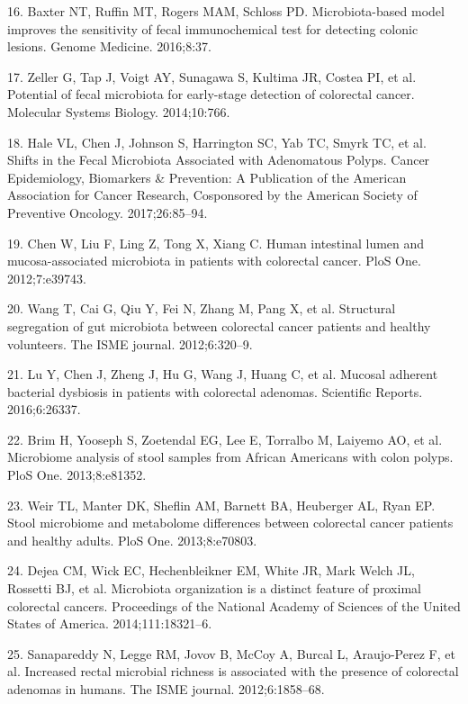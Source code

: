 \documentclass[12pt,]{article}
\begin{document}
\hypertarget{ref-baxter_microbiota-based_2016}{}
16. Baxter NT, Ruffin MT, Rogers MAM, Schloss PD. Microbiota-based model
improves the sensitivity of fecal immunochemical test for detecting
colonic lesions. Genome Medicine. 2016;8:37.

\hypertarget{ref-zeller_potential_2014}{}
17. Zeller G, Tap J, Voigt AY, Sunagawa S, Kultima JR, Costea PI, et al.
Potential of fecal microbiota for early-stage detection of colorectal
cancer. Molecular Systems Biology. 2014;10:766.

\hypertarget{ref-hale_shifts_2017}{}
18. Hale VL, Chen J, Johnson S, Harrington SC, Yab TC, Smyrk TC, et al.
Shifts in the Fecal Microbiota Associated with Adenomatous Polyps.
Cancer Epidemiology, Biomarkers \& Prevention: A Publication of the
American Association for Cancer Research, Cosponsored by the American
Society of Preventive Oncology. 2017;26:85--94.

\hypertarget{ref-chen_human_2012}{}
19. Chen W, Liu F, Ling Z, Tong X, Xiang C. Human intestinal lumen and
mucosa-associated microbiota in patients with colorectal cancer. PloS
One. 2012;7:e39743.

\hypertarget{ref-wang_structural_2012}{}
20. Wang T, Cai G, Qiu Y, Fei N, Zhang M, Pang X, et al. Structural
segregation of gut microbiota between colorectal cancer patients and
healthy volunteers. The ISME journal. 2012;6:320--9.

\hypertarget{ref-lu_mucosal_2016}{}
21. Lu Y, Chen J, Zheng J, Hu G, Wang J, Huang C, et al. Mucosal
adherent bacterial dysbiosis in patients with colorectal adenomas.
Scientific Reports. 2016;6:26337.

\hypertarget{ref-brim_microbiome_2013}{}
22. Brim H, Yooseph S, Zoetendal EG, Lee E, Torralbo M, Laiyemo AO, et
al. Microbiome analysis of stool samples from African Americans with
colon polyps. PloS One. 2013;8:e81352.

\hypertarget{ref-weir_stool_2013}{}
23. Weir TL, Manter DK, Sheflin AM, Barnett BA, Heuberger AL, Ryan EP.
Stool microbiome and metabolome differences between colorectal cancer
patients and healthy adults. PloS One. 2013;8:e70803.

\hypertarget{ref-dejea_microbiota_2014}{}
24. Dejea CM, Wick EC, Hechenbleikner EM, White JR, Mark Welch JL,
Rossetti BJ, et al. Microbiota organization is a distinct feature of
proximal colorectal cancers. Proceedings of the National Academy of
Sciences of the United States of America. 2014;111:18321--6.

\hypertarget{ref-sanapareddy_increased_2012}{}
25. Sanapareddy N, Legge RM, Jovov B, McCoy A, Burcal L, Araujo-Perez F,
et al. Increased rectal microbial richness is associated with the
presence of colorectal adenomas in humans. The ISME journal.
2012;6:1858--68.
\end{document}
